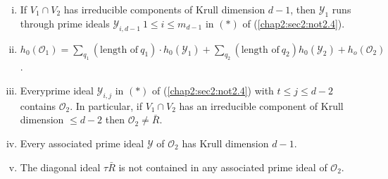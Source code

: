 \setcounter{lemma}{13}
\begin{lemma}\label{chap2:sec4:lem2.14}
  \begin{enumerate}[(i)]
  \item If $V_1 \cap V_2$ has irreducible components of Krull
    dimension $d-1$, then $\mathscr{Y}_1$ runs through prime ideals
    $\mathscr{Y}_{i,d-1} ~1 \leq i \leq m_{d-1}$ in $(*)$ of
    (\ref{chap2:sec2:not2.4}).  
  \item $h_0 (\mathscr{O}_1)=\sum \limits_{q_1} (\text{length of}~
    q_1)\cdot h_0 (\mathscr{Y}_1)+\sum \limits_{q_2}(\text{length of}~
    q_2)h_0 (\mathscr{Y}_2)+h_o(\mathscr{O}_2)$. 
  \item Every\pageoriginale prime ideal $\mathscr{Y}_{i, j}$ in $(*)$
    of (\ref{chap2:sec2:not2.4}) 
    with $t \leq j \leq d-2$ contains $\mathscr{O}_2$. In particular,
    if $V_1 \cap V_2$ has an irreducible component of Krull dimension
    $\leq d-2$ then $\mathscr{O}_2 \neq \bar{R}$. 
  \item Every associated prime ideal $\mathscr{Y}$ of
    $\mathscr{O}_2$ has Krull dimension $d-1$. 
  \item The diagonal ideal $\tau \bar{R}$ is not contained in any
    associated prime ideal of $\mathscr{O}_2$. 
\end{enumerate}
\end{lemma}

